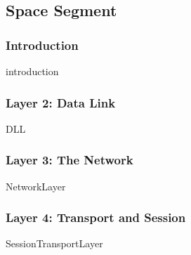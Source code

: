 \subsection{Space Segment}

%


\subsubsection{Introduction}
{introduction}

\subsubsection{Layer 2: Data Link}
{DLL}

\subsubsection{Layer 3: The Network}
{NetworkLayer}

\subsubsection{Layer 4: Transport and Session}
{SessionTransportLayer}